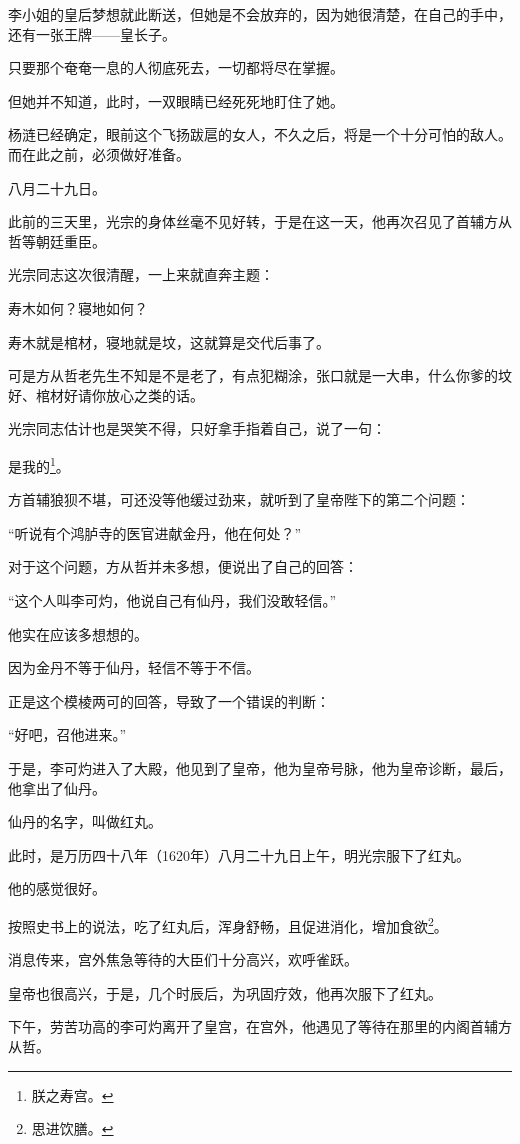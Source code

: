 \begin{multicols}{\theparacolNo}
		李小姐的皇后梦想就此断送，但她是不会放弃的，因为她很清楚，在自己的手中，还有一张王牌——皇长子。

		只要那个奄奄一息的人彻底死去，一切都将尽在掌握。

		但她并不知道，此时，一双眼睛已经死死地盯住了她。

		杨涟已经确定，眼前这个飞扬跋扈的女人，不久之后，将是一个十分可怕的敌人。而在此之前，必须做好准备。

		八月二十九日。

		此前的三天里，光宗的身体丝毫不见好转，于是在这一天，他再次召见了首辅方从哲等朝廷重臣。

		光宗同志这次很清醒，一上来就直奔主题：

		寿木如何？寝地如何？

		寿木就是棺材，寝地就是坟，这就算是交代后事了。

		可是方从哲老先生不知是不是老了，有点犯糊涂，张口就是一大串，什么你爹的坟好、棺材好请你放心之类的话。

		光宗同志估计也是哭笑不得，只好拿手指着自己，说了一句：

		是我的\footnote{朕之寿宫。}。

		方首辅狼狈不堪，可还没等他缓过劲来，就听到了皇帝陛下的第二个问题：

		“听说有个鸿胪寺的医官进献金丹，他在何处？”

		对于这个问题，方从哲并未多想，便说出了自己的回答：

		“这个人叫李可灼，他说自己有仙丹，我们没敢轻信。”

		他实在应该多想想的。

		因为金丹不等于仙丹，轻信不等于不信。

		正是这个模棱两可的回答，导致了一个错误的判断：

		“好吧，召他进来。”

		于是，李可灼进入了大殿，他见到了皇帝，他为皇帝号脉，他为皇帝诊断，最后，他拿出了仙丹。

		仙丹的名字，叫做红丸。

		此时，是万历四十八年（1620年）八月二十九日上午，明光宗服下了红丸。

		他的感觉很好。

		按照史书上的说法，吃了红丸后，浑身舒畅，且促进消化，增加食欲\footnote{思进饮膳。}。

		消息传来，宫外焦急等待的大臣们十分高兴，欢呼雀跃。

		皇帝也很高兴，于是，几个时辰后，为巩固疗效，他再次服下了红丸。

		下午，劳苦功高的李可灼离开了皇宫，在宫外，他遇见了等待在那里的内阁首辅方从哲。


\end{multicols}
